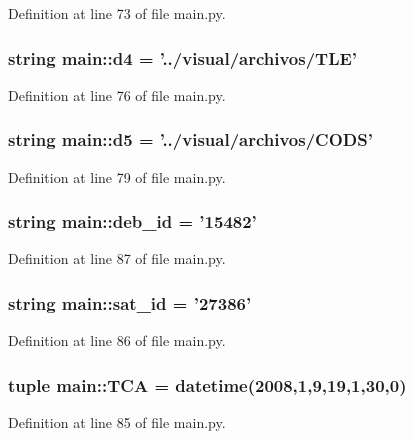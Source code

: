 \-Definition at line 73 of file main.\-py.

\subsubsection[{d4}]{\setlength{\rightskip}{0pt plus 5cm}string {\bf main\-::d4} = '../visual/archivos/\-T\-L\-E'}\label{namespacemain_a8b8ad98130c101c2c7c337a0d5830482}


\-Definition at line 76 of file main.\-py.

\subsubsection[{d5}]{\setlength{\rightskip}{0pt plus 5cm}string {\bf main\-::d5} = '../visual/archivos/\-C\-O\-D\-S'}\label{namespacemain_a5076ee750428395679d87a775c18fcd2}


\-Definition at line 79 of file main.\-py.

\subsubsection[{deb\-\_\-id}]{\setlength{\rightskip}{0pt plus 5cm}string {\bf main\-::deb\-\_\-id} = '15482'}\label{namespacemain_adb87a2d89ba6d7829f3855626103e536}


\-Definition at line 87 of file main.\-py.

\subsubsection[{sat\-\_\-id}]{\setlength{\rightskip}{0pt plus 5cm}string {\bf main\-::sat\-\_\-id} = '27386'}\label{namespacemain_a0ebd80e2cb4fe9bd351655d1e5894622}


\-Definition at line 86 of file main.\-py.

\subsubsection[{\-T\-C\-A}]{\setlength{\rightskip}{0pt plus 5cm}tuple {\bf main\-::\-T\-C\-A} = datetime(2008,1,9,19,1,30,0)}\label{namespacemain_a4222f1aa5b3addda5565ccfb4076c84e}


\-Definition at line 85 of file main.\-py.

